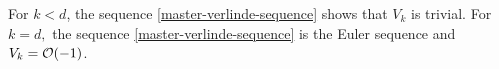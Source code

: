 \begin{remark}
	For $k<d$, the sequence \cref{master-verlinde-sequence} shows that $V_k$ is trivial. For $k=d,$ the sequence \cref{master-verlinde-sequence} is the Euler sequence and $V_k=\mathcal{O}(-1)$.
\end{remark}











